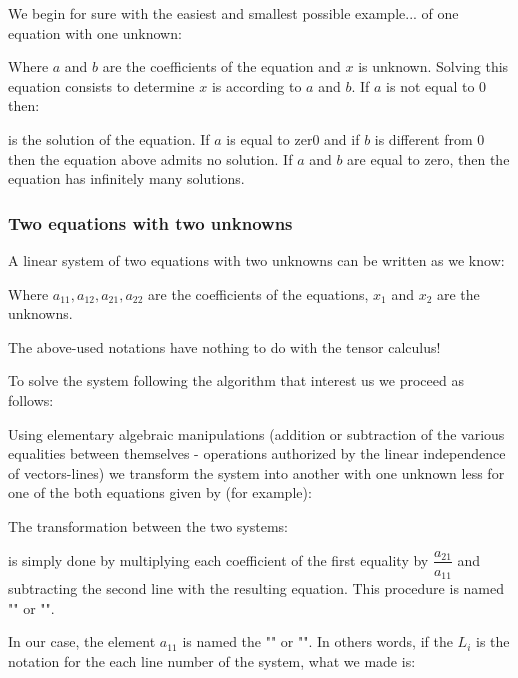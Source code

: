 	We begin for sure with the easiest and smallest possible example... of one equation with one unknown:
	
	Where $a$ and $b$ are the coefficients of the equation and $x$ is unknown. Solving this equation consists to determine $x$ is according to $a$ and $b$. If $a$ is not equal to $0$ then:
		
	is the solution of the equation. If $a$ is equal to zer0 and if $b$ is different from $0$ then the equation above admits no solution. If $a$ and $b$ are equal to zero, then the equation has infinitely many solutions.
	
	\subsubsection{Two equations with two unknowns}
	
	A linear system of two equations with two unknowns can be written as we know:
		
		Where $a_{11},a_{12},a_{21},a_{22}$ are the coefficients of the equations, $x_1$ and $x_2$ are the unknowns.
		
		\begin{tcolorbox}[title=Remark,colframe=black,arc=10pt]
The above-used notations have nothing to do with the tensor calculus!
		\end{tcolorbox}	
		
		To solve the system following the algorithm that interest us we proceed as follows:
		
		Using elementary algebraic manipulations (addition or subtraction of the various equalities between themselves - operations authorized by the linear independence of vectors-lines) we transform the system into another with one unknown less for one of the both equations given by (for example):
		
		The transformation between the two systems:
		
		is simply done by multiplying each coefficient of the first equality by $\dfrac{a_{21}}{a_{11}}$ and subtracting the second line with the resulting equation. This procedure is named "" or "". 
		
		In our case, the element $a_{11}$ is named the "" or "". In others words, if the $L_i$ is the notation for the each line number of the system, what we made is:
		
